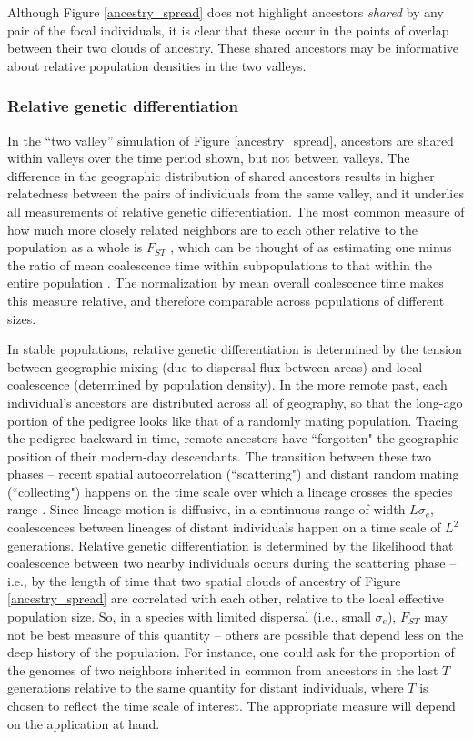 \documentclass{ar-1col}
\renewcommand{\emph}[1]{{\textit{#1}}}
\begin{document}
Although Figure \ref{ancestry_spread} does not highlight 
ancestors \emph{shared} by any pair of the focal individuals,
it is clear that these occur in the points of overlap between their two clouds of ancestry.
These shared ancestors may be informative about relative population densities in the two valleys.


\subsubsection{Relative genetic differentiation}

In the ``two valley'' simulation of Figure \ref{ancestry_spread},
ancestors are shared within valleys over the time period shown,
but not between valleys.
The difference in the geographic distribution of shared ancestors 
results in higher relatedness between the pairs of individuals 
from the same valley, 
and it underlies all measurements of relative genetic differentiation.
The most common measure of
how much more closely related neighbors are to each other relative to the population as a whole
is $F_{ST}$ \citep{Wright1951},
which can be thought of as estimating
one minus the ratio of mean coalescence time within subpopulations
to that within the entire population \citep{slatkin_1991inbreeding}.
The normalization by mean overall coalescence time 
makes this measure relative, 
and therefore comparable across populations of different sizes.

In stable populations,
relative genetic differentiation is determined by the tension between 
geographic mixing (due to dispersal flux between areas)
and local coalescence (determined by population density).
In the more remote past, each individual's ancestors are distributed across
all of geography,
so that the long-ago portion of the pedigree looks like that of a randomly mating population.
Tracing the pedigree backward in time, 
remote ancestors have ``forgotten" the geographic position of their 
modern-day descendants.
The transition between these two phases -- recent spatial autocorrelation 
(``scattering") and distant random mating (``collecting")
\citep{Wakeley1999,wilkins2004separationoftimescales}
happens on the time scale over which a lineage crosses the species range \citep{Wakeley1999}.
Since lineage motion is diffusive, in a continuous range of width $L \sigma_e$,
coalescences between lineages of distant individuals happen on a time scale of $L^2$ generations.
Relative genetic differentiation
is determined by the likelihood that coalescence between two nearby individuals
occurs during the scattering phase
-- i.e., by the length of time that two spatial clouds of ancestry of Figure \ref{ancestry_spread}
are correlated with each other,
relative to the local effective population size.
So, in a species with limited dispersal (i.e., small $\sigma_e$),
$F_{ST}$ may not be best measure of this quantity -- 
others are possible that depend less on the deep history of the population.
For instance,
one could ask for the proportion of the genomes of two neighbors 
inherited in common from ancestors in the last $T$ generations
relative to the same quantity for distant individuals,
where $T$ is chosen to reflect the time scale of interest.
The appropriate measure will depend on the application at hand.
\end{document}
